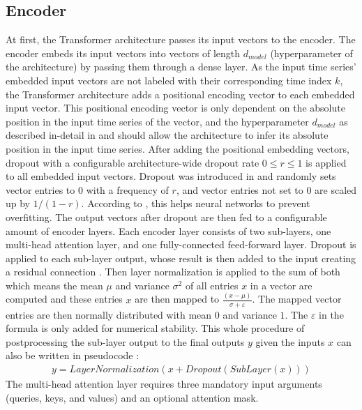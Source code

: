 \documentclass[draft,final]{vutinfth} %
\begin{document}
    \subsection{Encoder} \label{encoder}
    At first, the Transformer architecture passes its input vectors to the encoder.
    The encoder embeds its input vectors into vectors of length $d_{model}$ (hyperparameter of the architecture) by passing them through a dense layer.
    As the input time series' embedded input vectors are not labeled with their corresponding time index $k$, the Transformer architecture adds a positional encoding vector to each embedded input vector.
    This positional encoding vector is only dependent on the absolute position in the input time series of the vector, and the hyperparameter $d_{model}$ as described in-detail in \cite[p. 6]{Transformer} and should allow the architecture to infer its absolute position in the input time series.
    After adding the positional embedding vectors, dropout with a configurable architecture-wide dropout rate $0 \leq r \leq 1$ is applied to all embedded input vectors.
    Dropout was introduced in \cite{dropout} and randomly sets vector entries to $0$ with a frequency of $r$, and vector entries not set to $0$ are scaled up by $1/(1-r)$.
    According to \cite[p. 1]{dropout}, this helps neural networks to prevent overfitting.
    The output vectors after dropout are then fed to a configurable amount of encoder layers.
    Each encoder layer consists of two sub-layers, one multi-head attention layer, and one fully-connected feed-forward layer.
    Dropout is applied to each sub-layer output, whose result is then added to the input creating a residual connection \cite{ResNet}.
    Then layer normalization \cite{layer_norm} is applied to the sum of both which means the mean $\mu$ and variance $\sigma^2$ of all entries $x$ in a vector are computed and these entries $x$ are then mapped to $\frac{(x-\mu)}{\sigma + \varepsilon}$.
    The mapped vector entries are then normally distributed with mean $0$ and variance $1$. The $\varepsilon$ in the formula is only added for numerical stability.
    This whole procedure of postprocessing the sub-layer output to the final outputs $y$ given the inputs $x$ can also be written in pseudocode \cite[p. 3]{Transformer}:
    \begin{align}
        y = LayerNormalization(x + Dropout(SubLayer(x)))
    \end{align}
    The multi-head attention layer requires three mandatory input arguments (queries, keys, and values) and an optional attention mask.
\end{document}
